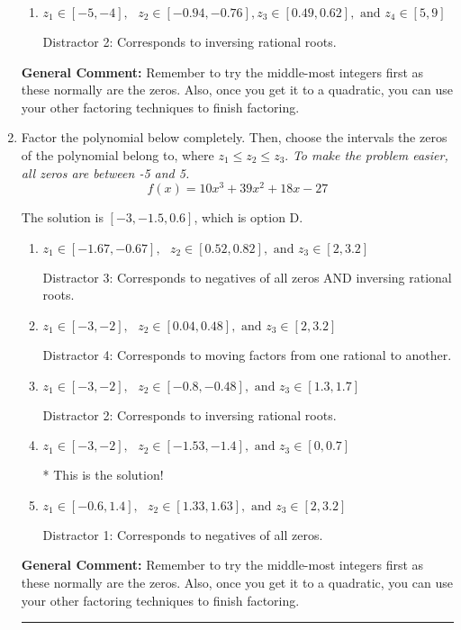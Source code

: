 \documentclass{extbook}[14pt]
\newcommand{\litem}[1]{\item #1

\rule{\textwidth}{0.4pt}}
\begin{document}
\begin{enumerate}
{\begin{enumerate}[label=\Alph*.]
 Distractor 3: Corresponds to negatives of all zeros AND inversing rational roots.
\item \( z_1 \in [-5, -4], \text{   }  z_2 \in [-0.94, -0.76], z_3 \in [0.49, 0.62], \text{   and   } z_4 \in [5, 9] \)

 Distractor 2: Corresponds to inversing rational roots.
\end{enumerate}

\textbf{General Comment:} Remember to try the middle-most integers first as these normally are the zeros. Also, once you get it to a quadratic, you can use your other factoring techniques to finish factoring.
}
\litem{
Factor the polynomial below completely. Then, choose the intervals the zeros of the polynomial belong to, where $z_1 \leq z_2 \leq z_3$. \textit{To make the problem easier, all zeros are between -5 and 5.}
\[ f(x) = 10x^{3} +39 x^{2} +18 x -27 \]

The solution is \( [-3, -1.5, 0.6] \), which is option D.\begin{enumerate}[label=\Alph*.]
\item \( z_1 \in [-1.67, -0.67], \text{   }  z_2 \in [0.52, 0.82], \text{   and   } z_3 \in [2, 3.2] \)

 Distractor 3: Corresponds to negatives of all zeros AND inversing rational roots.
\item \( z_1 \in [-3, -2], \text{   }  z_2 \in [0.04, 0.48], \text{   and   } z_3 \in [2, 3.2] \)

 Distractor 4: Corresponds to moving factors from one rational to another.
\item \( z_1 \in [-3, -2], \text{   }  z_2 \in [-0.8, -0.48], \text{   and   } z_3 \in [1.3, 1.7] \)

 Distractor 2: Corresponds to inversing rational roots.
\item \( z_1 \in [-3, -2], \text{   }  z_2 \in [-1.53, -1.4], \text{   and   } z_3 \in [0, 0.7] \)

* This is the solution!
\item \( z_1 \in [-0.6, 1.4], \text{   }  z_2 \in [1.33, 1.63], \text{   and   } z_3 \in [2, 3.2] \)

 Distractor 1: Corresponds to negatives of all zeros.
\end{enumerate}

\textbf{General Comment:} Remember to try the middle-most integers first as these normally are the zeros. Also, once you get it to a quadratic, you can use your other factoring techniques to finish factoring.
}
\end{enumerate}
\end{document}
